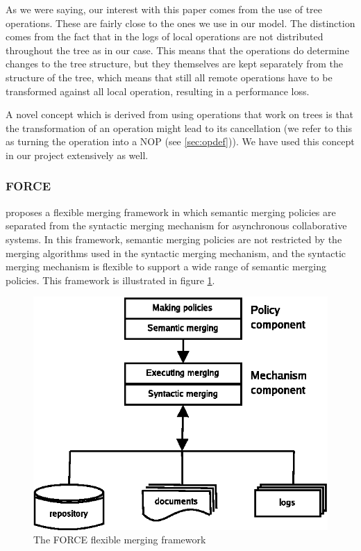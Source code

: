 As we were saying, our interest with this paper comes from the use of tree operations. These are
fairly close to the ones we use in our model. The distinction comes from the fact that in
\cite{molli02} the logs of local operations are not distributed throughout the tree as in our
case. This means that the operations do determine changes to the tree structure, but they themselves
are kept separately from the structure of the tree, which means that still all remote operations
have to be transformed against all local operation, resulting in a performance loss.

A novel concept which is derived from using operations that work on trees is that the transformation
of an operation might lead to its cancellation (we refer to this as turning the operation into a
NOP (see \ref{sec:opdef})). We have used this concept in our project extensively as well.

\subsubsection{FORCE}

\cite{shen02} proposes a flexible merging framework in which semantic merging policies are separated
from the syntactic merging mechanism for asynchronous collaborative systems. In this framework,
semantic merging policies are not restricted by the merging algorithms used in the syntactic merging
mechanism, and the syntactic merging mechanism is flexible to support a wide range of semantic
merging policies. This framework is illustrated in figure \ref{fig:force}.

\begin{figure}[ht]
\begin{center}
\includegraphics{img/force.eps}
\end{center}
\caption{The FORCE flexible merging framework}
\label{fig:force}
\end{figure}


